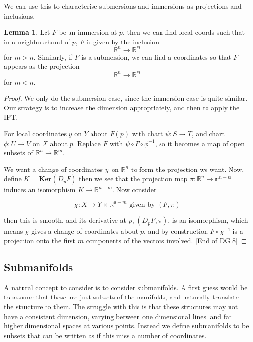 \documentclass{article}
\theoremstyle{definition}
\newtheorem{lemma}{Lemma}
\begin{document}
We can use this to characterise submersions and immersions as projections and
inclusions.

\begin{lemma}
Let $F$ be an immersion at $p$, then we can find local coords such that in a
neighbourhood of $p$, $F$ is given by the inclusion
$$ \mathbb{R}^n \to \mathbb{R}^m $$
for $m > n$. Similarly, if $F$ is a submersion, we can find a coordinates so that $F$ appears
as the projection
$$ \mathbb{R}^n \to \mathbb{R}^m$$
for $m < n$.
\end{lemma}
\begin{proof}
We only do the submersion case, since the immersion case is quite similar. Our
strategy is to increase the dimension appropriately, and then to apply the IFT.

For local coordinates $y$ on $Y$ about $F(p)$ with chart $\psi : S \to T$, and
chart $\phi : U \to V$ on $X$ about $p$. Replace $F$ with $\psi \circ F \circ
\phi^{-1}$, so it becomes a map of open subsets of $\mathbb{R}^n \to
\mathbb{R}^m$.

We want a change of coordinates $\chi$ on $\mathbb{R}^n$ to form the projection
we want. Now, define $K = \textbf{Ker}(D_pF)$ then we see that the projection
map $\pi : \mathbb{R}^n \to \mathbb{r}^{n - m}$ induces an isomorphism $K \to
\mathbb{R}^{n - m}$. Now consider

$$ \chi : X \to Y \times \mathbb{R}^{n - m} \text{ given by } (F, \pi) $$ 

then this is smooth, and its derivative at $p$, $(D_p F, \pi)$, is an
isomorphism, which means $\chi$ gives a change of coordinates about $p$, and by
construction $F \circ \chi^{-1}$ is a projection onto the first $m$ components
of the vectors involved. [End of DG 8]
\end{proof}

\subsection{Submanifolds}

A natural concept to consider is to consider submanifolds. A first guess would
be to assume that these are just subsets of the manifolds, and naturally
translate the structure to them. The struggle with this is that these structures
may not have a consistent dimension, varying between one dimensional lines, and
far higher dimensional spaces at various points. Instead we define submanifolds
to be subsets that can be written as if this miss a number of coordinates.
\end{document}
